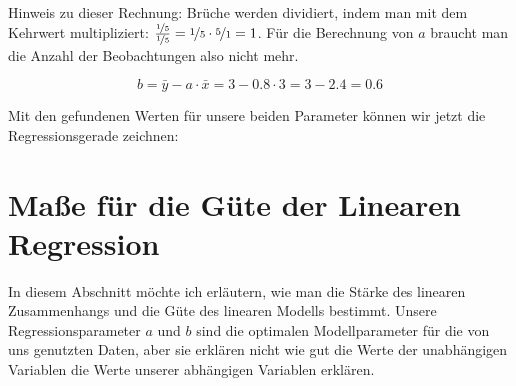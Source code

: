 \documentclass[ngerman, 12pt]{scrartcl}
\begin{document}
Hinweis zu dieser Rechnung: Brüche werden dividiert, indem man mit dem Kehrwert multipliziert: \( \frac{\nicefrac{1}{5}}{\nicefrac{1}{5}}   = \nicefrac{1}{5} \cdot \nicefrac{5}{1}  = 1 \). Für die Berechnung von \(a\) braucht man die Anzahl der Beobachtungen also nicht mehr.

\[ b = \bar y - a\cdot \bar x = 3 - 0.8 \cdot 3 = 3 - 2.4 = 0.6 \]

Mit den gefundenen Werten für unsere beiden Parameter können wir jetzt die Regressionsgerade zeichnen:\vspace*{-11mm}

\begin{center}
\vspace*{1em}
\label{fig:final}\vspace*{1em}
\end{center}

\section{Maße für die Güte der Linearen Regression}

In diesem Abschnitt möchte ich erläutern, wie man die Stärke des linearen Zusammenhangs und die Güte des linearen Modells bestimmt. Unsere Regressionsparameter \(a\) und \(b\) sind die optimalen Modellparameter für die von uns genutzten Daten, aber sie erklären nicht wie gut die Werte der unabhängigen Variablen die Werte unserer abhängigen Variablen erklären.
\end{document}
